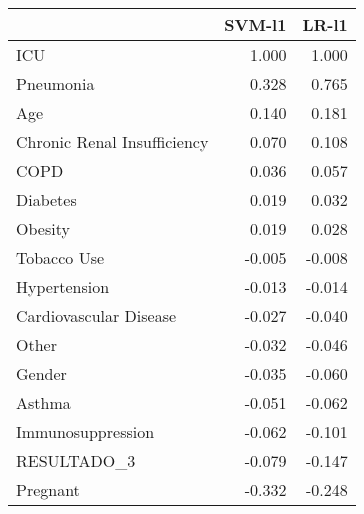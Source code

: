 \begin{tabular}{lrr}
\toprule
{} &  SVM-l1 &  LR-l1 \\
\midrule
ICU                         &   1.000 &  1.000 \\
Pneumonia                   &   0.328 &  0.765 \\
Age                         &   0.140 &  0.181 \\
Chronic Renal Insufficiency &   0.070 &  0.108 \\
COPD                        &   0.036 &  0.057 \\
Diabetes                    &   0.019 &  0.032 \\
Obesity                     &   0.019 &  0.028 \\
Tobacco Use                 &  -0.005 & -0.008 \\
Hypertension                &  -0.013 & -0.014 \\
Cardiovascular Disease      &  -0.027 & -0.040 \\
Other                       &  -0.032 & -0.046 \\
Gender                      &  -0.035 & -0.060 \\
Asthma                      &  -0.051 & -0.062 \\
Immunosuppression           &  -0.062 & -0.101 \\
RESULTADO\_3                 &  -0.079 & -0.147 \\
Pregnant                    &  -0.332 & -0.248 \\
\bottomrule
\end{tabular}
